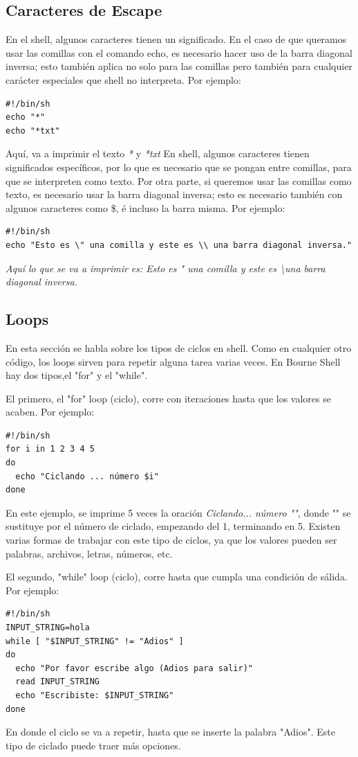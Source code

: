\documentclass[a4paper]{article}
\begin{document}
\subsection{Caracteres de Escape}

En el shell, algunos caracteres tienen un significado. En el caso de que queramos usar las comillas con el comando echo, es necesario hacer uso de la barra diagonal inversa; esto también aplica no solo para las comillas pero también para cualquier carácter especiales que shell no interpreta. Por ejemplo:
\begin{verbatim}
#!/bin/sh
echo "*"
echo "*txt"
\end{verbatim}
Aquí, va a imprimir el texto \textit{*} y \textit{*txt}
En shell, algunos caracteres tienen significados específicos, por lo que es necesario que se pongan entre comillas, para que se interpreten como texto. Por otra parte, si queremos usar las comillas como texto, es necesario usar la barra diagonal inversa; esto es necesario también con algunos caracteres como \$, \' e incluso la barra misma. Por ejemplo:
\begin{verbatim}
#!/bin/sh
echo "Esto es \" una comilla y este es \\ una barra diagonal inversa."
\end{verbatim}
\textit{Aquí lo que se va a imprimir es: Esto es " una comilla y este es \textbackslash una barra diagonal inversa.}

\subsection{Loops}
En esta sección se habla sobre los tipos de ciclos en shell. Como en cualquier otro código, los loops sirven para repetir alguna tarea varias veces. En Bourne Shell hay dos tipos,el "for" y el "while".

El primero, el "for" loop (ciclo), corre con iteraciones hasta que los valores se acaben. Por ejemplo:
\begin{verbatim}
#!/bin/sh
for i in 1 2 3 4 5
do
  echo "Ciclando ... número $i"
done
\end{verbatim}
En este ejemplo, se imprime 5 veces la oración \textit{Ciclando... número ""}, donde "" se sustituye por el número de ciclado, empezando del 1, terminando en 5.
Existen varias formas de trabajar con este tipo de ciclos, ya que los valores pueden ser palabras, archivos, letras, números, etc.

El segundo, "while" loop (ciclo), corre hasta que cumpla una condición de sálida. Por ejemplo:
\begin{verbatim}
#!/bin/sh
INPUT_STRING=hola
while [ "$INPUT_STRING" != "Adios" ]
do
  echo "Por favor escribe algo (Adios para salir)"
  read INPUT_STRING
  echo "Escribiste: $INPUT_STRING"
done
\end{verbatim}
En donde el ciclo se va a repetir, hasta que se inserte la palabra "Adios". Este tipo de ciclado puede traer más opciones.
\end{document}
